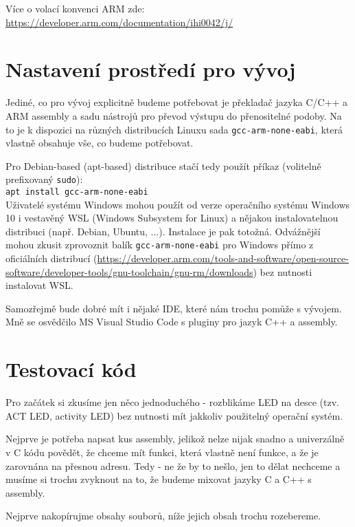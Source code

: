 \documentclass{article}
\begin{document}
Více o volací konvenci ARM zde: \url{https://developer.arm.com/documentation/ihi0042/j/}

\section{Nastavení prostředí pro vývoj}

Jediné, co pro vývoj explicitně budeme potřebovat je překladač jazyka C/C++ a ARM assembly a sadu nástrojů pro převod výstupu do přenositelné podoby. Na to je k dispozici na různých distribucích Linuxu sada \texttt{gcc-arm-none-eabi}, která vlastně obsahuje vše, co budeme potřebovat.

Pro Debian-based (apt-based) distribuce stačí tedy použít příkaz (volitelně prefixovaný \texttt{sudo}):\\

\texttt{apt install gcc-arm-none-eabi}\\

Uživatelé systému Windows mohou použít od verze operačního systému Windows 10 i vestavěný WSL (Windows Subsystem for Linux) a nějakou instalovatelnou distribuci (např. Debian, Ubuntu, ...). Instalace je pak totožná. Odvážnější mohou zkusit zprovoznit balík \texttt{gcc-arm-none-eabi} pro Windows přímo z oficiálních distribucí (\url{https://developer.arm.com/tools-and-software/open-source-software/developer-tools/gnu-toolchain/gnu-rm/downloads}) bez nutnosti instalovat WSL.

Samozřejmě bude dobré mít i nějaké IDE, které nám trochu pomůže s vývojem. Mně se osvědčilo MS Visual Studio Code s pluginy pro jazyk C++ a assembly.



\section{Testovací kód}

Pro začátek si zkusíme jen něco jednoduchého - rozblikáme LED na desce (tzv. ACT LED, activity LED) bez nutnosti mít jakkoliv použitelný operační systém.

Nejprve je potřeba napsat kus assembly, jelikož nelze nijak snadno a univerzálně v C kódu povědět, že chceme mít funkci, která vlastně není funkce, a že je zarovnána na přesnou adresu. Tedy - ne že by to nešlo, jen to dělat nechceme a musíme si trochu zvyknout na to, že budeme mixovat jazyky C a C++ s assembly.

Nejprve nakopírujme obsahy souborů, níže jejich obsah trochu rozebereme.
\end{document}
